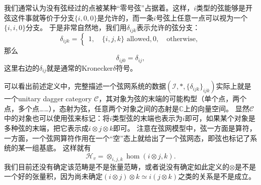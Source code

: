 我们通常认为没有弦经过的点被某种“零号弦”占据着。这样，$i$类型的弦能够是开弦这件事就等价于分支$\{i, 0, 0\}$是允许的，而一条$i$号弦上任意一点可以视为一个$\{i, i, 0\}$分支。
于是非常自然地，我们用$\delta_{ijk}$表示允许的弦分支：
\begin{equation}
    \delta_{ijk} = \begin{cases}
        1, \quad \{i, j, k\} \text{ allowed},
        0, \quad \text{otherwise},
    \end{cases}
\end{equation}
那么
\begin{equation}
    \delta_{ij0} = \delta_{ij},
\end{equation}
这里右边的$\delta_{ij}$就是通常的Kronecker$\delta$符号。

可以看出前述定义中，完整描述一个弦网系统的数据$(\mathcal{I}, *, \{\delta_{ijk}\}_{ijk})$实际上就是一个unitary dagger category $\mathcal{C}$，其对象为弦的末端的可能构型（单个点，两个点，多个点……），态射为弦，任意两个对象之间的态射是$\mathbb{C}$上的向量空间。
显然$\mathcal{C}$中的对象也可以使用弦来标记：将$i$类型弦的末端也表示为$i$即可，如果某个对象是多种弦的末端，把它表示成$i \otimes j \otimes k$即可。
注意在弦网模型中，弦一方面是算符，一方面，一个弦网算符作用在一个“空”态上就给出了一个弦网态，即弦也标记了系统的某一组基底。
这样就有
\begin{equation}
    \mathcal{H}_v = \otimes_{i, j, k} \hom(i \otimes j, k).
\end{equation}
我们目前还没有确定该范畴是不是张量范畴，或者说没有确定如此定义的$\otimes$是不是一个好的张量积，因为尚未确定$(i \otimes j) \otimes k \simeq i (j \otimes k)$之类的关系是不是成立。

